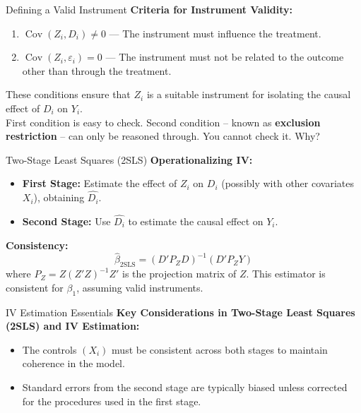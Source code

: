 \documentclass{beamer}
\theoremstyle{plain}
\begin{document}
	\begin{frame}{Defining a Valid Instrument}
		\textbf{Criteria for Instrument Validity:}
		\begin{enumerate}
			\item \(\operatorname{Cov}(Z_i, D_i) \neq 0\) — The instrument must influence the treatment.
			\item \(\operatorname{Cov}(Z_i, \varepsilon_i) = 0\) — The instrument must not be related to the outcome other than through the treatment.
		\end{enumerate}
		These conditions ensure that \(Z_i\) is a suitable instrument for isolating the causal effect of \(D_i\) on \(Y_i\).\\
		\vspace{1em}
		First condition is easy to check. Second condition -- known as \textbf{exclusion restriction} -- can only be reasoned through. You cannot check it. Why?
	\end{frame}
	
	\begin{frame}{Two-Stage Least Squares (2SLS)}
		\textbf{Operationalizing IV:}
		\begin{itemize}
			\item \textbf{First Stage:} Estimate the effect of \(Z_i\) on \(D_i\) (possibly with other covariates \(X_i\)), obtaining \(\widehat{D_i}\).
			\item \textbf{Second Stage:} Use \(\widehat{D_i}\) to estimate the causal effect on \(Y_i\).
		\end{itemize}
		\textbf{Consistency:}
		\[
		\hat{\beta}_\text{2SLS} = \left( D' P_Z D \right)^{-1} \left( D' P_Z Y \right)
		\]
		where \(P_Z = Z (Z'Z)^{-1} Z'\) is the projection matrix of \(Z\). This estimator is consistent for \(\beta_1\), assuming valid instruments.
	\end{frame}

\begin{frame}{IV Estimation Essentials}
	\textbf{Key Considerations in Two-Stage Least Squares (2SLS) and IV Estimation:}
	\begin{itemize}
		\item The controls $(X_i)$ must be consistent across both stages to maintain coherence in the model.
		\item Standard errors from the second stage are typically biased unless corrected for the procedures used in the first stage.
	\end{itemize}
\end{frame}
\end{document}
